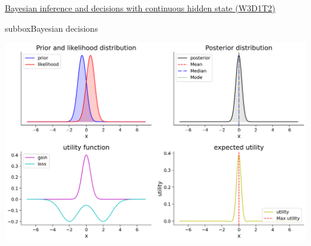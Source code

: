 \begin{textbox}{\href{https://compneuro.neuromatch.io/tutorials/W3D1_BayesianDecisions/student/W3D1_Tutorial2.html}{Bayesian inference and decisions with continuous hidden state (W3D1T2)} }
\begin{subbox}{subbox}{Bayesian decisions}
\begin{center}
\includegraphics[scale=0.23]{Figures/BD/BD_Figure13.png}
\end{center}

\end{subbox}
\end{textbox}

